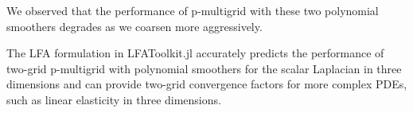 \documentclass[review]{siamart190516}
\begin{document}
We observed that the performance of p-multigrid with these two polynomial smoothers degrades as we coarsen more aggressively.

The LFA formulation in LFAToolkit.jl accurately predicts the performance of two-grid p-multigrid with polynomial smoothers for the scalar Laplacian in three dimensions and can provide two-grid convergence factors for more complex PDEs, such as linear elasticity in three dimensions.



\end{document}
